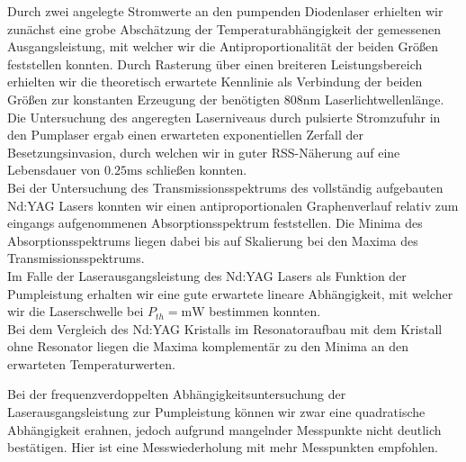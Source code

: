 \documentclass[../main.tex]{subfiles}
\begin{document}
    Durch zwei angelegte Stromwerte an den pumpenden Diodenlaser erhielten wir zunächst eine grobe Abschätzung der Temperaturabhängigkeit der gemessenen Ausgangsleistung, mit welcher wir die Antiproportionalität der beiden Größen feststellen konnten. Durch Rasterung über einen breiteren Leistungsbereich erhielten wir die theoretisch erwartete Kennlinie als Verbindung der beiden Größen zur konstanten Erzeugung der benötigten $808\si{\nm}$ Laserlichtwellenlänge. \\

    Die Untersuchung des angeregten Laserniveaus durch pulsierte Stromzufuhr in den Pumplaser ergab einen erwarteten exponentiellen Zerfall der Besetzungsinvasion, durch welchen wir in guter RSS-Näherung auf eine Lebensdauer von $0.25\si{\ms}$ schließen konnten. \\

    Bei der Untersuchung des Transmissionsspektrums des vollständig aufgebauten Nd:YAG Lasers konnten wir einen antiproportionalen Graphenverlauf relativ zum eingangs aufgenommenen Absorptionsspektrum feststellen. Die Minima des Absorptionsspektrums liegen dabei bis auf Skalierung bei den Maxima des Transmissionsspektrums. \\

    Im Falle der Laserausgangsleistung des Nd:YAG Lasers als Funktion der Pumpleistung erhalten wir eine gute erwartete lineare Abhängigkeit, mit welcher wir die Laserschwelle bei $P_{th} =  \si{\mW}$ bestimmen konnten. \\

    Bei dem Vergleich des Nd:YAG Kristalls im Resonatoraufbau mit dem Kristall ohne Resonator liegen die Maxima komplementär zu den Minima an den erwarteten Temperaturwerten. 

    Bei der frequenzverdoppelten Abhängigkeitsuntersuchung der Laserausgangsleistung zur Pumpleistung können wir zwar eine quadratische Abhängigkeit erahnen, jedoch aufgrund mangelnder Messpunkte nicht deutlich bestätigen. Hier ist eine Messwiederholung mit mehr Messpunkten empfohlen. 
\end{document}
